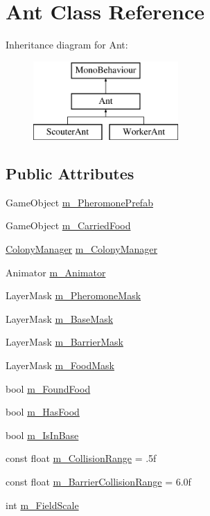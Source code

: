 \hypertarget{class_ant}{}\section{Ant Class Reference}
\label{class_ant}
Inheritance diagram for Ant\+:\begin{figure}[H]
\begin{center}
\leavevmode
\includegraphics[height=3.000000cm]{class_ant}
\end{center}
\end{figure}
\subsection*{Public Attributes}
\begin{DoxyCompactItemize}
\item 
Game\+Object \mbox{\hyperlink{class_ant_af45c9cb83741452ab3d9b53dd805b0d4}{m\+\_\+\+Pheromone\+Prefab}}
\item 
Game\+Object \mbox{\hyperlink{class_ant_a2f5e5943c1b4816cfde9791eda5bb3d4}{m\+\_\+\+Carried\+Food}}
\item 
\mbox{\hyperlink{class_colony_manager}{Colony\+Manager}} \mbox{\hyperlink{class_ant_a20ae71a3bb7168a8060f64921cee5535}{m\+\_\+\+Colony\+Manager}}
\item 
Animator \mbox{\hyperlink{class_ant_a84ab10598fb0b465de56a3f08467e430}{m\+\_\+\+Animator}}
\item 
Layer\+Mask \mbox{\hyperlink{class_ant_a5560e7cd6782f3fbd656067b301f55e1}{m\+\_\+\+Pheromone\+Mask}}
\item 
Layer\+Mask \mbox{\hyperlink{class_ant_af508268710b48eec78e401702bc8c963}{m\+\_\+\+Base\+Mask}}
\item 
Layer\+Mask \mbox{\hyperlink{class_ant_a84b0e760e1d45f2c677ac58f2f8aeedc}{m\+\_\+\+Barrier\+Mask}}
\item 
Layer\+Mask \mbox{\hyperlink{class_ant_a7e2f1b3ab31e918848398eac87b846c9}{m\+\_\+\+Food\+Mask}}
\item 
bool \mbox{\hyperlink{class_ant_a0c9094c3dfbf95966e405eabb065ccaf}{m\+\_\+\+Found\+Food}}
\item 
bool \mbox{\hyperlink{class_ant_a89d67e5b747ec4fe30300dd48c921487}{m\+\_\+\+Has\+Food}}
\item 
bool \mbox{\hyperlink{class_ant_ad3c425527e6b1c557819b619f5feefb6}{m\+\_\+\+Is\+In\+Base}}
\item 
const float \mbox{\hyperlink{class_ant_a02d9e64b053fc28648c31389d697852f}{m\+\_\+\+Collision\+Range}} = .\+5f
\item 
const float \mbox{\hyperlink{class_ant_af0d5aee1cc97deda5d5024c6cad96b84}{m\+\_\+\+Barrier\+Collision\+Range}} = 6.\+0f
\item 
int \mbox{\hyperlink{class_ant_ac1e4122db022746fc6c2654366bbab7a}{m\+\_\+\+Field\+Scale}}
\end{DoxyCompactItemize}
